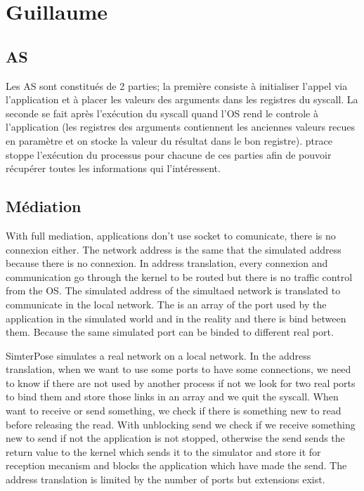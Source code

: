 \documentclass{article}
\begin{document}
\section{Guillaume}
\subsection{AS}
Les AS sont constitués de 2 parties; la première consiste à initialiser l'appel
via l'application et à placer les valeurs des arguments dans les registres du
syscall. La seconde se fait après l'exécution du syscall quand l'OS rend le
controle à l'application (les registres des arguments contiennent les anciennes
valeurs recues en paramètre et on stocke la valeur du résultat dans le bon
registre). ptrace stoppe l'exécution du processus pour chacune de ces parties
afin de pouvoir récupérer toutes les informations qui l'intéressent.

\subsection{Médiation}
With full mediation, applications don't use socket to comunicate, there is no
connexion either. The network address is the same that the simulated address
because there is no connexion.  In address translation, every connexion and
communication go through the kernel to be routed but there is no traffic control
from the OS. The simulated address of the simultaed network is translated to
communicate in the local network. The is an array of the port used by the
application in the simulated world and in the reality and there is bind between
them. Because the same simulated port can be binded to different real port.

SimterPose simulates a real network on a local network. In the address
translation, when we want to use some ports to have some connections, we need to
know if there are not used by another process if not we look for two real ports
to bind them and store those links in an array and we quit the syscall. When
want to receive or send something, we check if there is something new to read
before releasing the read. With unblocking send we check if we receive something
new to send if not the application is not stopped, otherwise the send sends the
return value to the kernel which sends it to the simulator and store it for
reception mecanism and blocks the application which have made the send. The
address translation is limited by the number of ports but extensions exist.
\end{document}
